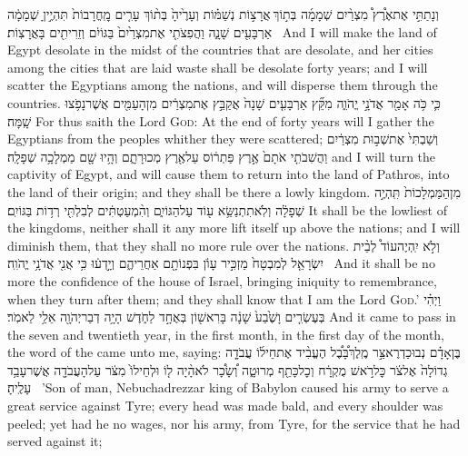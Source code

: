 {וְנָתַתִּ֣י אֶת\maqqaf אֶ֩רֶץ֩ מִצְרַ֨יִם שְׁמָמָ֜ה בְּת֣וֹךְ \legarmeh  אֲרָצ֣וֹת נְשַׁמּ֗וֹת וְעָרֶ֙יהָ֙ בְּת֨וֹךְ עָרִ֤ים מׇֽחֳרָבוֹת֙ תִּהְיֶ֣יןָ שְׁמָמָ֔ה אַרְבָּעִ֖ים שָׁנָ֑ה וַהֲפִצֹתִ֤י אֶת\maqqaf מִצְרַ֙יִם֙ בַּגּוֹיִ֔ם וְזֵרִיתִ֖ים בָּאֲרָצֽוֹת׃ \setuma }
{And I will make the land of Egypt desolate in the midst of the countries that are desolate, and her cities among the cities that are laid waste shall be desolate forty years; and I will scatter the Egyptians among the nations, and will disperse them through the countries.}
{כִּ֛י כֹּ֥ה אָמַ֖ר אֲדֹנָ֣י יֱהֹוִ֑ה מִקֵּ֞ץ אַרְבָּעִ֤ים שָׁנָה֙ אֲקַבֵּ֣ץ אֶת\maqqaf מִצְרַ֔יִם מִן\maqqaf הָעַמִּ֖ים אֲשֶׁר\maqqaf נָפֹ֥צוּ שָֽׁמָּה׃}
{For thus saith the Lord \textsc{God}: At the end of forty years will I gather the Egyptians from the peoples whither they were scattered;}
{וְשַׁבְתִּי֙ אֶת\maqqaf שְׁב֣וּת מִצְרַ֔יִם וַהֲשִׁבֹתִ֤י אֹתָם֙ אֶ֣רֶץ פַּתְר֔וֹס עַל\maqqaf אֶ֖רֶץ מְכוּרָתָ֑ם וְהָ֥יוּ שָׁ֖ם מַמְלָכָ֥ה שְׁפָלָֽה׃}
{and I will turn the captivity of Egypt, and will cause them to return into the land of Pathros, into the land of their origin; and they shall be there a lowly kingdom.}
{מִן\maqqaf הַמַּמְלָכוֹת֙ תִּֽהְיֶ֣ה שְׁפָלָ֔ה וְלֹֽא\maqqaf תִתְנַשֵּׂ֥א ע֖וֹד עַל\maqqaf הַגּוֹיִ֑ם וְהִ֨מְעַטְתִּ֔ים לְבִלְתִּ֖י רְד֥וֹת בַּגּוֹיִֽם׃}
{It shall be the lowliest of the kingdoms, neither shall it any more lift itself up above the nations; and I will diminish them, that they shall no more rule over the nations.}
{וְלֹ֣א יִֽהְיֶה\maqqaf עוֹד֩ לְבֵ֨ית יִשְׂרָאֵ֤ל לְמִבְטָח֙ מַזְכִּ֣יר עָוֺ֔ן בִּפְנוֹתָ֖ם אַחֲרֵיהֶ֑ם וְיָ֣דְע֔וּ כִּ֥י אֲנִ֖י אֲדֹנָ֥י יֱהֹוִֽה׃ \petucha }
{And it shall be no more the confidence of the house of Israel, bringing iniquity to remembrance, when they turn after them; and they shall know that I am the Lord \textsc{God}.’}
{וַיְהִ֗י בְּעֶשְׂרִ֤ים וָשֶׁ֙בַע֙ שָׁנָ֔ה בָּרִאשׁ֖וֹן בְּאֶחָ֣ד לַחֹ֑דֶשׁ הָיָ֥ה דְבַר\maqqaf יְהֹוָ֖ה אֵלַ֥י לֵאמֹֽר׃}
{And it came to pass in the seven and twentieth year, in the first month, in the first day of the month, the word of the \lord\space came unto me, saying:}
{בֶּן\maqqaf אָדָ֗ם נְבוּכַדְרֶאצַּ֣ר מֶֽלֶךְ\maqqaf בָּ֠בֶ֠ל הֶעֱבִ֨יד אֶת\maqqaf חֵיל֜וֹ עֲבֹדָ֤ה גְדוֹלָה֙ אֶל\maqqaf צֹ֔ר כׇּל\maqqaf רֹ֣אשׁ מֻקְרָ֔ח וְכׇל\maqqaf כָּתֵ֖ף מְרוּטָ֑ה וְ֠שָׂכָ֠ר לֹא\maqqaf הָ֨יָה ל֤וֹ וּלְחֵילוֹ֙ מִצֹּ֔ר עַל\maqqaf הָעֲבֹדָ֖ה אֲשֶׁר\maqqaf עָבַ֥ד עָלֶֽיהָ׃ \setuma }
{’Son of man, Nebuchadrezzar king of Babylon caused his army to serve a great service against Tyre; every head was made bald, and every shoulder was peeled; yet had he no wages, nor his army, from Tyre, for the service that he had served against it;}
